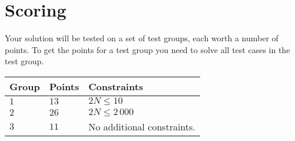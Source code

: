 \section*{Scoring}
Your solution will be tested on a set of test groups, each worth a number of points.
To get the points for a test group you need to solve all test cases in the test group.

\noindent
\begin{tabular}{| l | l | l |}
  \hline
  Group & Points & Constraints \\ \hline
  $1$    & $13$        &  $2N \le 10$ \\ \hline
  $2$    & $26$        &  $2N \le 2\,000$ \\ \hline
  $3$    & $11$        &  No additional constraints. \\ \hline
\end{tabular}
